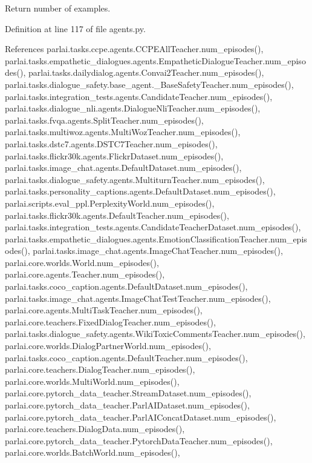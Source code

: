 \begin{DoxyVerb}Return number of examples.\end{DoxyVerb}
 

Definition at line 117 of file agents.\+py.



References parlai.\+tasks.\+ccpe.\+agents.\+C\+C\+P\+E\+All\+Teacher.\+num\+\_\+episodes(), parlai.\+tasks.\+empathetic\+\_\+dialogues.\+agents.\+Empathetic\+Dialogue\+Teacher.\+num\+\_\+episodes(), parlai.\+tasks.\+dailydialog.\+agents.\+Convai2\+Teacher.\+num\+\_\+episodes(), parlai.\+tasks.\+dialogue\+\_\+safety.\+base\+\_\+agent.\+\_\+\+Base\+Safety\+Teacher.\+num\+\_\+episodes(), parlai.\+tasks.\+integration\+\_\+tests.\+agents.\+Candidate\+Teacher.\+num\+\_\+episodes(), parlai.\+tasks.\+dialogue\+\_\+nli.\+agents.\+Dialogue\+Nli\+Teacher.\+num\+\_\+episodes(), parlai.\+tasks.\+fvqa.\+agents.\+Split\+Teacher.\+num\+\_\+episodes(), parlai.\+tasks.\+multiwoz.\+agents.\+Multi\+Woz\+Teacher.\+num\+\_\+episodes(), parlai.\+tasks.\+dstc7.\+agents.\+D\+S\+T\+C7\+Teacher.\+num\+\_\+episodes(), parlai.\+tasks.\+flickr30k.\+agents.\+Flickr\+Dataset.\+num\+\_\+episodes(), parlai.\+tasks.\+image\+\_\+chat.\+agents.\+Default\+Dataset.\+num\+\_\+episodes(), parlai.\+tasks.\+dialogue\+\_\+safety.\+agents.\+Multiturn\+Teacher.\+num\+\_\+episodes(), parlai.\+tasks.\+personality\+\_\+captions.\+agents.\+Default\+Dataset.\+num\+\_\+episodes(), parlai.\+scripts.\+eval\+\_\+ppl.\+Perplexity\+World.\+num\+\_\+episodes(), parlai.\+tasks.\+flickr30k.\+agents.\+Default\+Teacher.\+num\+\_\+episodes(), parlai.\+tasks.\+integration\+\_\+tests.\+agents.\+Candidate\+Teacher\+Dataset.\+num\+\_\+episodes(), parlai.\+tasks.\+empathetic\+\_\+dialogues.\+agents.\+Emotion\+Classification\+Teacher.\+num\+\_\+episodes(), parlai.\+tasks.\+image\+\_\+chat.\+agents.\+Image\+Chat\+Teacher.\+num\+\_\+episodes(), parlai.\+core.\+worlds.\+World.\+num\+\_\+episodes(), parlai.\+core.\+agents.\+Teacher.\+num\+\_\+episodes(), parlai.\+tasks.\+coco\+\_\+caption.\+agents.\+Default\+Dataset.\+num\+\_\+episodes(), parlai.\+tasks.\+image\+\_\+chat.\+agents.\+Image\+Chat\+Test\+Teacher.\+num\+\_\+episodes(), parlai.\+core.\+agents.\+Multi\+Task\+Teacher.\+num\+\_\+episodes(), parlai.\+core.\+teachers.\+Fixed\+Dialog\+Teacher.\+num\+\_\+episodes(), parlai.\+tasks.\+dialogue\+\_\+safety.\+agents.\+Wiki\+Toxic\+Comments\+Teacher.\+num\+\_\+episodes(), parlai.\+core.\+worlds.\+Dialog\+Partner\+World.\+num\+\_\+episodes(), parlai.\+tasks.\+coco\+\_\+caption.\+agents.\+Default\+Teacher.\+num\+\_\+episodes(), parlai.\+core.\+teachers.\+Dialog\+Teacher.\+num\+\_\+episodes(), parlai.\+core.\+worlds.\+Multi\+World.\+num\+\_\+episodes(), parlai.\+core.\+pytorch\+\_\+data\+\_\+teacher.\+Stream\+Dataset.\+num\+\_\+episodes(), parlai.\+core.\+pytorch\+\_\+data\+\_\+teacher.\+Parl\+A\+I\+Dataset.\+num\+\_\+episodes(), parlai.\+core.\+pytorch\+\_\+data\+\_\+teacher.\+Parl\+A\+I\+Concat\+Dataset.\+num\+\_\+episodes(), parlai.\+core.\+teachers.\+Dialog\+Data.\+num\+\_\+episodes(), parlai.\+core.\+pytorch\+\_\+data\+\_\+teacher.\+Pytorch\+Data\+Teacher.\+num\+\_\+episodes(), parlai.\+core.\+worlds.\+Batch\+World.\+num\+\_\+episodes(), 